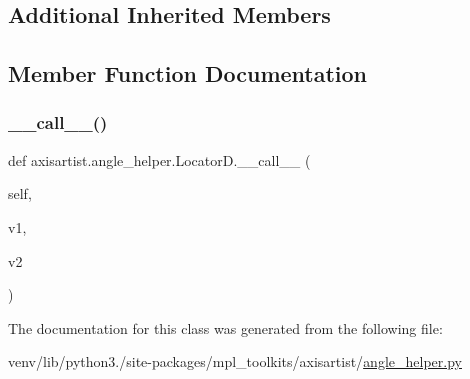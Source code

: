 \subsection*{Additional Inherited Members}


\subsection{Member Function Documentation}
\mbox{\label{classaxisartist_1_1angle__helper_1_1LocatorD_afc45969f387b7324087abedb9a7b712e}} 
\subsubsection{\texorpdfstring{\+\_\+\+\_\+call\+\_\+\+\_\+()}{\_\_call\_\_()}}
{\footnotesize\ttfamily def axisartist.\+angle\+\_\+helper.\+Locator\+D.\+\_\+\+\_\+call\+\_\+\+\_\+ (\begin{DoxyParamCaption}\item[{}]{self,  }\item[{}]{v1,  }\item[{}]{v2 }\end{DoxyParamCaption})}



The documentation for this class was generated from the following file\+:\begin{DoxyCompactItemize}
\item 
venv/lib/python3./site-\/packages/mpl\+\_\+toolkits/axisartist/\hyperlink{axisartist_2angle__helper_8py}{angle\+\_\+helper.\+py}\end{DoxyCompactItemize}
